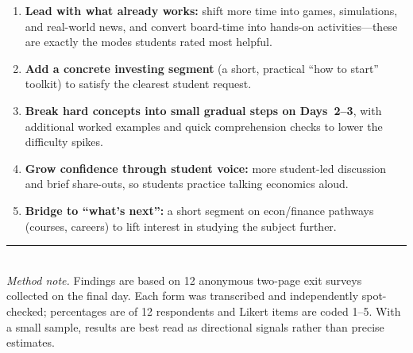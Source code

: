 \documentclass[letterpaper,10pt]{article}
\begin{document}
\begin{enumerate}[label=\textbf{\arabic*.},itemsep=3pt,topsep=2pt]
  \item \textbf{Lead with what already works:} shift more time into games, simulations, and
        real-world news, and convert board-time into hands-on activities---these are exactly the
        modes students rated most helpful.
  \item \textbf{Add a concrete investing segment} (a short, practical ``how to start'' toolkit)
        to satisfy the clearest student request.
  \item \textbf{Break hard concepts into small gradual steps on Days~2--3}, with additional
        worked examples and quick comprehension checks to lower the difficulty spikes.
  \item \textbf{Grow confidence through student voice:} more student-led discussion and brief
        share-outs, so students practice talking economics aloud.
  \item \textbf{Bridge to ``what's next'':} a short segment on econ/finance pathways (courses,
        careers) to lift interest in studying the subject further.
\end{enumerate}

\vspace{1em}
\noindent\rule{\textwidth}{0.4pt}\\[0.3em]
{\footnotesize\textit{Method note.} Findings are based on 12 anonymous two-page exit surveys
collected on the final day. Each form was transcribed and independently spot-checked; percentages
are of 12 respondents and Likert items are coded 1--5. With a small sample, results are best read
as directional signals rather than precise estimates.}
\end{document}
